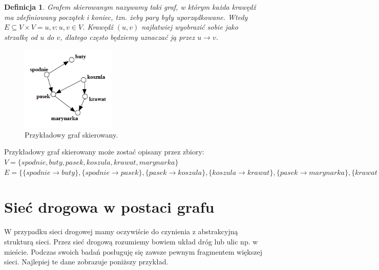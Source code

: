 \documentclass[twoside,12pt]{report}
\newtheorem{definition}{Definicja} %
\begin{document}
\vspace*{30px}
\begin{definition}\label{Graf skierowany}
Grafem skierowanym nazywamy taki graf, w którym każda krawędź ma zdefiniowany początek i koniec, tzn. żeby pary były uporządkowane. Wtedy $E \subseteq V \times V = {{u,v}:u,v \in V}$.
Krawędź $(u,v)$ najłatwiej wyobrazić sobie jako strzałkę od $u$ do $v$, dlatego często będziemy uznaczać ją przez $u \rightarrow v$.
\end{definition}

\begin{figure}[ht]
\begin{center}
\includegraphics[width=0.40\textwidth]{img/graf2}
\caption{Przykładowy graf skierowany\cite{grafy}.} 
\end{center}
\end{figure}

Przykładowy graf skierowany może zostać opisany przez zbiory:
\newline
\begin{math}
V=\{spodnie, buty, pasek, koszula, krawat, marynarka\}
\end{math}
\newline
\begin{math}
E=\{\{spodnie \rightarrow buty\},\{spodnie  \rightarrow pasek\},
	\{pasek \rightarrow koszula\},\{koszula \rightarrow krawat\},
	\{pasek \rightarrow marynarka\},\{krawat \rightarrow marynarka\}\}
\end{math}

\section{Sieć drogowa w postaci grafu}
W przypadku sieci drogowej mamy oczywiście do czynienia z abstrakcyjną strukturą sieci. Przez sieć drogową rozumiemy bowiem układ dróg lub ulic np. w mieście. Podczas swoich badań posługuję się zawsze pewnym fragmentem większej sieci. Najlepiej te dane zobrazuje poniższy przykład.
\end{document}
